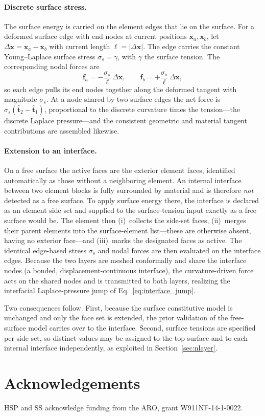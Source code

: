 \documentclass[final,3p,times]{elsarticle}
\begin{document}
\paragraph{Discrete surface stress.} The surface energy is carried on the element edges that lie on the surface. For a deformed surface edge with end nodes at current positions $\mathbf{x}_a,\mathbf{x}_b$, let $\Delta\mathbf{x}=\mathbf{x}_a-\mathbf{x}_b$ with current length $\ell=|\Delta\mathbf{x}|$. The edge carries the constant Young--Laplace surface stress $\sigma_s=\gamma$, with $\gamma$ the surface tension. The corresponding nodal forces are
\begin{equation}
	\mathbf{f}_a=-\frac{\sigma_s}{\ell}\,\Delta\mathbf{x},\qquad
	\mathbf{f}_b=+\frac{\sigma_s}{\ell}\,\Delta\mathbf{x},
\end{equation}
so each edge pulls its end nodes together along the deformed tangent with magnitude $\sigma_s$. At a node shared by two surface edges the net force is $\sigma_s(\hat{\mathbf{t}}_2-\hat{\mathbf{t}}_1)$, proportional to the discrete curvature times the tension---the discrete Laplace pressure---and the consistent geometric and material tangent contributions are assembled likewise.

\paragraph{Extension to an interface.} On a free surface the active faces are the exterior element faces, identified automatically as those without a neighboring element. An internal interface between two element blocks is fully surrounded by material and is therefore \emph{not} detected as a free surface. To apply surface energy there, the interface is declared as an element side set and supplied to the surface-tension input exactly as a free surface would be. The element then (i)~collects the side-set faces, (ii)~merges their parent elements into the surface-element list---these are otherwise absent, having no exterior face---and (iii)~marks the designated faces as active. The identical edge-based stress $\sigma_s$ and nodal forces are then evaluated on the interface edges. Because the two layers are meshed conformally and share the interface nodes (a bonded, displacement-continuous interface), the curvature-driven force acts on the shared nodes and is transmitted to both layers, realizing the interfacial Laplace-pressure jump of Eq.~\eqref{eq:interface_jump}.

Two consequences follow. First, because the surface constitutive model is unchanged and only the face set is extended, the prior validation of the free-surface model carries over to the interface. Second, surface tensions are specified per side set, so distinct values may be assigned to the top surface and to each internal interface independently, as exploited in Section~\ref{sec:nlayer}.

\section{Acknowledgements}

HSP and SS acknowledge funding from the ARO, grant W911NF-14-1-0022.


\end{document}
